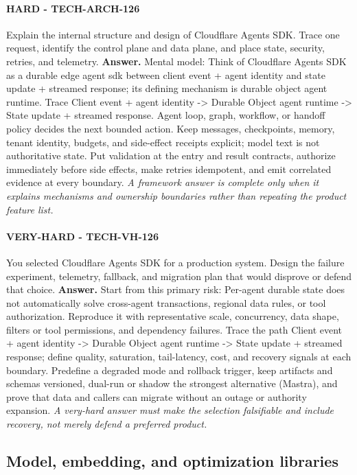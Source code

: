\paragraph{HARD - TECH-ARCH-126} Explain the internal structure and design of Cloudflare Agents SDK. Trace one request, identify the control plane and data plane, and place state, security, retries, and telemetry.
\textbf{Answer.} Mental model: Think of Cloudflare Agents SDK as a durable edge agent sdk between client event + agent identity and state update + streamed response; its defining mechanism is durable object agent runtime. Trace Client event + agent identity -> Durable Object agent runtime -> State update + streamed response. Agent loop, graph, workflow, or handoff policy decides the next bounded action. Keep messages, checkpoints, memory, tenant identity, budgets, and side-effect receipts explicit; model text is not authoritative state. Put validation at the entry and result contracts, authorize immediately before side effects, make retries idempotent, and emit correlated evidence at every boundary.
\textit{A framework answer is complete only when it explains mechanisms and ownership boundaries rather than repeating the product feature list.}
\paragraph{VERY-HARD - TECH-VH-126} You selected Cloudflare Agents SDK for a production system. Design the failure experiment, telemetry, fallback, and migration plan that would disprove or defend that choice.
\textbf{Answer.} Start from this primary risk: Per-agent durable state does not automatically solve cross-agent transactions, regional data rules, or tool authorization. Reproduce it with representative scale, concurrency, data shape, filters or tool permissions, and dependency failures. Trace the path Client event + agent identity -> Durable Object agent runtime -> State update + streamed response; define quality, saturation, tail-latency, cost, and recovery signals at each boundary. Predefine a degraded mode and rollback trigger, keep artifacts and schemas versioned, dual-run or shadow the strongest alternative (Mastra), and prove that data and callers can migrate without an outage or authority expansion.
\textit{A very-hard answer must make the selection falsifiable and include recovery, not merely defend a preferred product.}
\subsection{Model, embedding, and optimization libraries}

